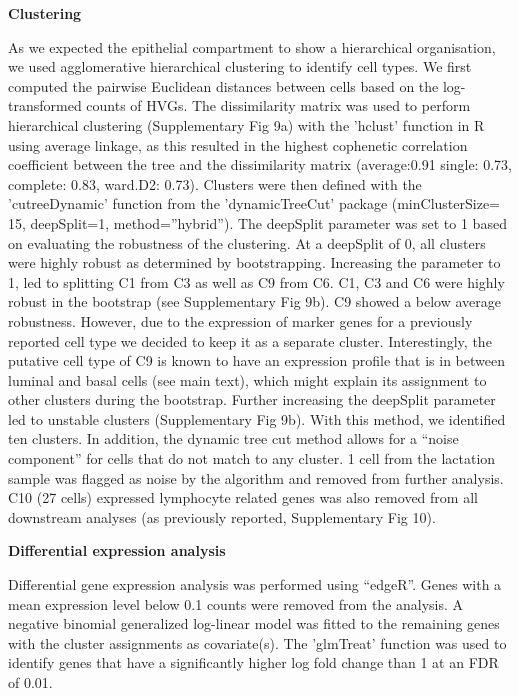 \documentclass[titlepage, 12pt, oneside]{amsart}
\begin{document}
\textbf{Clustering}

As we expected the epithelial compartment to show a hierarchical organisation, we used agglomerative hierarchical clustering to identify cell types.
We first computed the pairwise Euclidean distances between cells based on the log-transformed counts of HVGs.
The dissimilarity matrix was used to perform hierarchical clustering (Supplementary Fig 9a) with the 'hclust' function in R using average linkage, as this resulted in the highest cophenetic correlation coefficient between the tree and the dissimilarity matrix (average:0.91 single: 0.73, complete: 0.83, ward.D2: 0.73).
Clusters were then defined with the 'cutreeDynamic' function from the 'dynamicTreeCut' package (minClusterSize= 15, deepSplit=1, method=''hybrid'')\autocite{Langfelder2008}.
The deepSplit parameter was set to 1 based on evaluating the robustness of the clustering.
At a deepSplit of 0, all clusters were highly robust as determined by bootstrapping\autocite{Henning2015}.
Increasing the parameter to 1, led to splitting C1 from C3 as well as C9 from C6.
C1, C3 and C6 were highly robust in the bootstrap (see Supplementary Fig 9b).
C9 showed a below average robustness.
However, due to the expression of marker genes for a previously reported cell type\autocite{Wang2015} we decided to keep it as a separate cluster.
Interestingly, the putative cell type of C9 is known to have an expression profile that is in between luminal and basal cells (see main text), which might explain its assignment to other clusters during the bootstrap.
Further increasing the deepSplit parameter led to unstable clusters (Supplementary Fig 9b).
With this method, we identified ten clusters. In addition, the dynamic tree cut method allows for a ``noise component'' for cells that do not match to any cluster.
1 cell from the lactation sample was flagged as noise by the algorithm and removed from further analysis.
C10 (27 cells) expressed lymphocyte related genes was also removed from all downstream analyses (as previously reported\autocite{Scheele2017}, Supplementary Fig 10).

\textbf{Differential expression analysis }

Differential gene expression analysis was performed using ``edgeR''\autocite{Robinson2010}.
Genes with a mean expression level below 0.1 counts were removed from the analysis.
A negative binomial generalized log-linear model was fitted to the remaining genes with the cluster assignments as covariate(s).
The 'glmTreat' function was used to identify genes that have a significantly higher log fold change than 1 at an FDR of 0.01.
\end{document}

